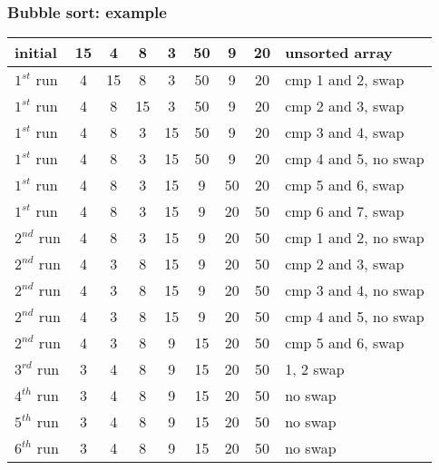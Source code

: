 \documentclass[newPxFont,sthlmFooter,nooffset]{beamer}
\begin{document}
\begin{frame}[t]
  \frametitle{Bubble sort: example}
  \begin{tabular}{p{1.5cm}| c | c | c | c | c | c | c |p{4cm}}

initial & 15 & 4  & 8  & 3  & 50 & 9 & 20 & unsorted array \\ \hline
$1^{st}$ run & \color{red} 4  & \color{red}15 & 8  & 3  & 50 & 9 & 20 & cmp 1 and 2, swap \pause\\  \hline
$1^{st}$ run & 4  & \color{red}8  & \color{red}15 & 3  & 50 & 9 & 20 & cmp 2 and 3, swap \pause \\ \hline
$1^{st}$ run & 4  & 8  & \color{red}3  & \color{red}15 & 50 & 9 & 20 & cmp 3 and 4, swap \pause \\ \hline
$1^{st}$ run & 4  & 8  & 3  & 15 & 50 & 9 & 20 & cmp 4 and 5, no swap \pause \\ \hline
$1^{st}$ run & 4  & 8  & 3  & 15 & \color{red}9 & \color{red}50 & 20 & cmp 5 and 6, swap \pause \\ \hline
$1^{st}$ run & 4  & 8  & 3  & 15 & 9 & \color{red}20 & \color{red}50 & cmp 6 and 7, swap \pause \\ \hline
$2^{nd}$ run & 4  & 8  & 3  & 15 & 9 & 20 & \color{blue}50 & cmp 1 and 2, no swap  \\ \hline
$2^{nd}$ run & 4  & \color{red}3  & \color{red}8  & 15 & 9 & 20 & \color{blue}50 & cmp 2 and 3,  swap  \\ \hline
$2^{nd}$ run & 4  & 3  & 8  & 15 & 9 & 20 & \color{blue}50 & cmp 3 and 4, no swap  \\ \hline
$2^{nd}$ run & 4  & 3  & 8  & 15 & 9 & 20 & \color{blue}50 & cmp 4 and 5, no swap  \\ \hline
$2^{nd}$ run & 4  & 3  & 8  & \color{red}9  & \color{red}15 & \color{blue}20 & \color{blue}50 & cmp 5 and 6, swap  \\ \hline
$3^{rd}$ run & \color{red}3  & \color{red}4  & 8  & 9  & \color{blue}15 & \color{blue}20 & \color{blue}50 & 1, 2 swap  \\ \hline
$4^{th}$ run & 3  & 4  & 8  & \color{blue}9  & \color{blue}15 & \color{blue}20 & \color{blue}50 & no swap  \\ \hline
$5^{th}$ run & 3  & 4  & \color{blue}8  & \color{blue}9  & \color{blue}15 & \color{blue}20 & \color{blue}50 & no swap  \\ \hline
$6^{th}$ run & 3  & \color{blue}4  & \color{blue}8  & \color{blue}9  & \color{blue}15 & \color{blue}20 & \color{blue}50 & no swap  \\ 
  \end{tabular}
\end{frame}
\end{document}
